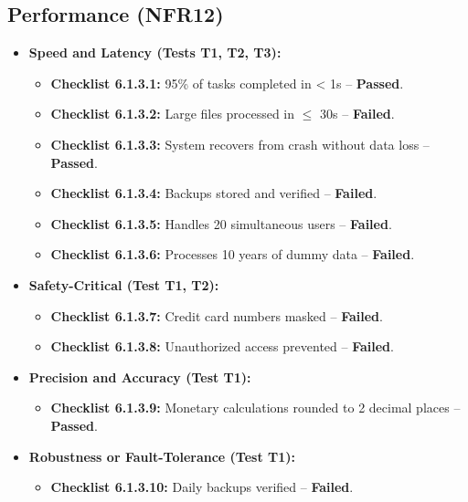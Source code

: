 \documentclass[12pt, titlepage]{article}
\begin{document}
\subsection{Performance (NFR12)}  
\label{nfr12}

\begin{itemize}
    \item \textbf{Speed and Latency (Tests T1, T2, T3):}  
    \begin{itemize}
        \item \textbf{Checklist 6.1.3.1:} 95\% of tasks completed in < 1s – \textbf{Passed}.  
        \item \textbf{Checklist 6.1.3.2:} Large files processed in $\le$ 30s – \textbf{Failed}.  
        \item \textbf{Checklist 6.1.3.3:} System recovers from crash without data loss – \textbf{Passed}.  
        \item \textbf{Checklist 6.1.3.4:} Backups stored and verified – \textbf{Failed}.  
        \item \textbf{Checklist 6.1.3.5:} Handles 20 simultaneous users – \textbf{Failed}.  
        \item \textbf{Checklist 6.1.3.6:} Processes 10 years of dummy data – \textbf{Failed}.  
    \end{itemize}
    
    \item \textbf{Safety-Critical (Test T1, T2):}  
    \begin{itemize}
        \item \textbf{Checklist 6.1.3.7:} Credit card numbers masked – \textbf{Failed}.  
        \item \textbf{Checklist 6.1.3.8:} Unauthorized access prevented – \textbf{Failed}.  
    \end{itemize}
    
    \item \textbf{Precision and Accuracy (Test T1):}  
    \begin{itemize}
        \item \textbf{Checklist 6.1.3.9:} Monetary calculations rounded to 2 decimal places – \textbf{Passed}.  
    \end{itemize}
    
    \item \textbf{Robustness or Fault-Tolerance (Test T1):}  
    \begin{itemize}
        \item \textbf{Checklist 6.1.3.10:} Daily backups verified – \textbf{Failed}.  
    \end{itemize}
    

\end{itemize}
\end{document}
